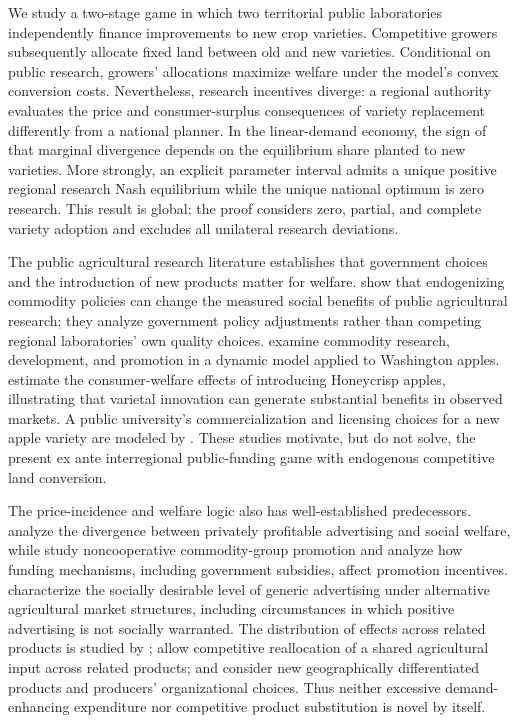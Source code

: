 \documentclass[11pt,a4paper]{article}
\begin{document}
We study a two-stage game in which two territorial public laboratories independently finance improvements to new crop varieties. Competitive growers subsequently allocate fixed land between old and new varieties. Conditional on public research, growers' allocations maximize welfare under the model's convex conversion costs. Nevertheless, research incentives diverge: a regional authority evaluates the price and consumer-surplus consequences of variety replacement differently from a national planner. In the linear-demand economy, the sign of that marginal divergence depends on the equilibrium share planted to new varieties. More strongly, an explicit parameter interval admits a unique positive regional research Nash equilibrium while the unique national optimum is zero research. This result is global: the proof considers zero, partial, and complete variety adoption and excludes all unilateral research deviations.

The public agricultural research literature establishes that government choices and the introduction of new products matter for welfare. \citet{swinnen1998endogenous} show that endogenizing commodity policies can change the measured social benefits of public agricultural research; they analyze government policy adjustments rather than competing regional laboratories' own quality choices. \citet{richards2002commodity} examine commodity research, development, and promotion in a dynamic model applied to Washington apples. \citet{wang2020honeycrisp} estimate the consumer-welfare effects of introducing Honeycrisp apples, illustrating that varietal innovation can generate substantial benefits in observed markets. A public university's commercialization and licensing choices for a new apple variety are modeled by \citet{akhundjanov2020apple}. These studies motivate, but do not solve, the present ex ante interregional public-funding game with endogenous competitive land conversion.

The price-incidence and welfare logic also has well-established predecessors. \citet{dixit1978advertising} analyze the divergence between privately profitable advertising and social welfare, while \citet{alston2001beggar} study noncooperative commodity-group promotion and \citet{freebairn2001funding} analyze how funding mechanisms, including government subsidies, affect promotion incentives. \citet{cardon2003market} characterize the socially desirable level of generic advertising under alternative agricultural market structures, including circumstances in which positive advertising is not socially warranted. The distribution of effects across related products is studied by \citet{kinnucan2000distributional}; \citet{balagtas2007dairy} allow competitive reallocation of a shared agricultural input across related products; and \citet{lence2007collective} consider new geographically differentiated products and producers' organizational choices. Thus neither excessive demand-enhancing expenditure nor competitive product substitution is novel by itself.
\end{document}
